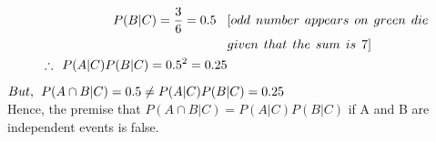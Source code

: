 \documentclass[a4paper,fleqn,11pt]{article}
\theoremstyle{mytheor}
\begin{document}
\begin{align*}
P (B | C) = \frac{3}{6} = 0.5 \hspace{2ex} & [odd \hspace{1ex} number \hspace{1ex}appears \hspace{1ex} on \hspace{1ex} green \hspace{1ex} die \\
& given \hspace{1ex} that \hspace{1ex} the \hspace{1ex} sum \hspace{1ex} is \hspace{1ex} 7]\\
\therefore \hspace{1ex} P (A | C) P (B | C) = 0.5^2 = 0.25
\end{align*}
$But, \hspace{1ex} P (A \cap B | C) = 0.5 \neq P (A | C) P (B | C) = 0.25$ \\
Hence, the premise that $P (A \cap B | C) = P (A | C) P (B | C)$ if A and B are independent events is false.
\pagebreak
\end{document}
